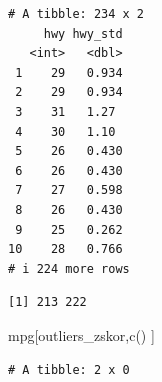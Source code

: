 \documentclass[
  letterpaper,
  DIV=11,
  numbers=noendperiod]{scrreprt}
\newenvironment{Shaded}{\begin{snugshade}}{\end{snugshade}}
\newcommand{\CommentTok}[1]{\textcolor[rgb]{0.37,0.37,0.37}{#1}}
\newcommand{\ControlFlowTok}[1]{\textcolor[rgb]{0.00,0.23,0.31}{\textbf{#1}}}
\newcommand{\DecValTok}[1]{\textcolor[rgb]{0.68,0.00,0.00}{#1}}
\newcommand{\FunctionTok}[1]{\textcolor[rgb]{0.28,0.35,0.67}{#1}}
\newcommand{\NormalTok}[1]{\textcolor[rgb]{0.00,0.23,0.31}{#1}}
\newcommand{\OtherTok}[1]{\textcolor[rgb]{0.00,0.23,0.31}{#1}}
\newcommand{\SpecialCharTok}[1]{\textcolor[rgb]{0.37,0.37,0.37}{#1}}
\newcommand{\StringTok}[1]{\textcolor[rgb]{0.13,0.47,0.30}{#1}}
\begin{document}
\begin{Shaded}
\end{Shaded}

\begin{verbatim}
# A tibble: 234 x 2
     hwy hwy_std
   <int>   <dbl>
 1    29   0.934
 2    29   0.934
 3    31   1.27 
 4    30   1.10 
 5    26   0.430
 6    26   0.430
 7    27   0.598
 8    26   0.430
 9    25   0.262
10    28   0.766
# i 224 more rows
\end{verbatim}

\begin{Shaded}
\end{Shaded}

\begin{verbatim}
[1] 213 222
\end{verbatim}

\begin{Shaded}
\begin{Highlighting}[]
\NormalTok{mpg[outliers\_zskor,}\FunctionTok{c}\NormalTok{() ]}
\end{Highlighting}
\end{Shaded}

\begin{verbatim}
# A tibble: 2 x 0
\end{verbatim}
\end{document}
